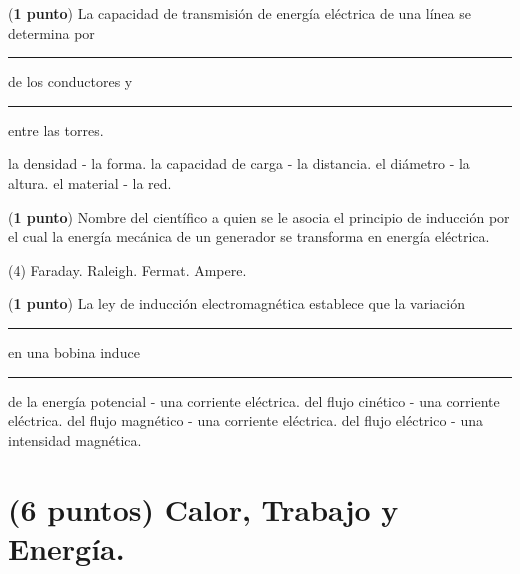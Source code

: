 \documentclass[12pt, letter]{exam}
\begin{document}
\begin{questions}
    \newpage

    \question (\textbf{1 punto}) La capacidad de transmisión de energía eléctrica de una línea se determina por \rule{2cm}{0.1mm} de los conductores y \rule{2cm}{0.1mm} entre las torres.
    \begin{multicols}{2}
    \begin{tasks}
        \task la densidad - la forma.
        \task la capacidad de carga - la distancia.
        \task el diámetro - la altura.
        \task el material - la red.
    \end{tasks}
    \end{multicols}
    \question (\textbf{1 punto}) Nombre del científico a quien se le asocia el principio de inducción por el cual la energía mecánica de un generador se transforma en energía eléctrica.
    \begin{tasks}(4)
        \task Faraday.
        \task Raleigh.
        \task Fermat.
        \task Ampere.
    \end{tasks}
    \question (\textbf{1 punto}) La ley de inducción electromagnética establece que la variación \rule{2cm}{0.1mm} en una bobina induce \rule{2cm}{0.1mm}
    \begin{tasks}
        \task de la energía potencial - una corriente eléctrica.
        \task del flujo cinético - una corriente eléctrica.
        \task del flujo magnético - una corriente eléctrica.
        \task del flujo eléctrico - una intensidad magnética.
    \end{tasks}
    
    \section{(6 puntos) Calor, Trabajo y Energía.}
    

\end{questions}
\end{document}
